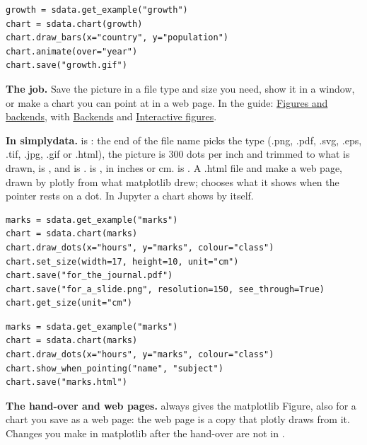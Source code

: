 \begin{lstlisting}[style=py]
growth = sdata.get_example("growth")
chart = sdata.chart(growth)
chart.draw_bars(x="country", y="population")
chart.animate(over="year")
chart.save("growth.gif")
\end{lstlisting}


\textbf{The job.} Save the picture in a file type and size you need, show it in a window, or make a
chart you can point at in a web page. In the guide:
\href{https://matplotlib.org/stable/users/explain/figure/index.html}{Figures and backends}, with
\href{https://matplotlib.org/stable/users/explain/figure/backends.html}{Backends} and
\href{https://matplotlib.org/stable/users/explain/figure/interactive.html}{Interactive figures}.

\textbf{In simplydata.}  is : the end of the file name picks the type
(.png, .pdf, .svg, .eps, .tif, .jpg, .gif or .html), the picture is 300 dots per inch and trimmed to
what is drawn,  is , and  is
.  is , in inches or cm.  is
. A .html file and  make a web page, drawn by plotly from
what matplotlib drew;  chooses what it shows when the pointer rests on a
dot. In Jupyter a chart shows by itself.

\begin{lstlisting}[style=py]
marks = sdata.get_example("marks")
chart = sdata.chart(marks)
chart.draw_dots(x="hours", y="marks", colour="class")
chart.set_size(width=17, height=10, unit="cm")
chart.save("for_the_journal.pdf")
chart.save("for_a_slide.png", resolution=150, see_through=True)
chart.get_size(unit="cm")
\end{lstlisting}

\begin{lstlisting}[style=py]
marks = sdata.get_example("marks")
chart = sdata.chart(marks)
chart.draw_dots(x="hours", y="marks", colour="class")
chart.show_when_pointing("name", "subject")
chart.save("marks.html")
\end{lstlisting}

\textbf{The hand-over and web pages.}  always gives the matplotlib
Figure, also for a chart you save as a web page: the web page is a copy that plotly draws from it.
Changes you make in matplotlib after the hand-over are not in .

